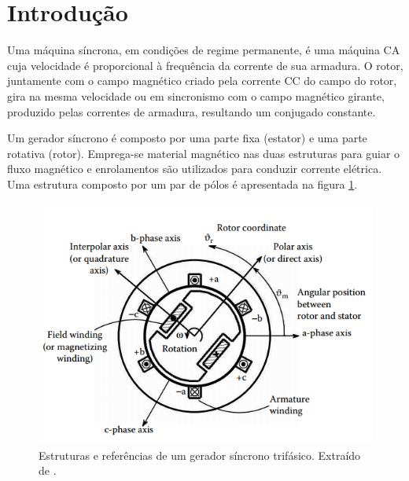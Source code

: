 \section{Introdução}
\label{cap4:introducao}
Uma máquina síncrona, em condições de regime permanente, é uma máquina CA cuja velocidade é proporcional à frequência da corrente de sua armadura. O rotor, juntamente com o campo magnético criado pela corrente CC do campo do rotor, gira na mesma velocidade ou em sincronismo com o campo magnético girante, produzido pelas correntes de armadura, resultando um conjugado constante.
%

Um gerador síncrono é composto por uma parte fixa (estator) e uma parte rotativa (rotor). Emprega-se material magnético nas duas estruturas para guiar o fluxo magnético e enrolamentos são utilizados para conduzir corrente elétrica. Uma estrutura composto por um par de pólos é apresentada na figura \ref{maq_sinc}.
%
\begin{figure}[H]
\centering
\includegraphics[scale=0.9]{img/assig4/ger_sinc_3ph.png}
\caption[Estruturas e referências de um gerador síncrono trifásico]{Estruturas e referências de um gerador síncrono trifásico. Extraído de \cite{Bianc}.}
\label{maq_sinc}
\end{figure}
